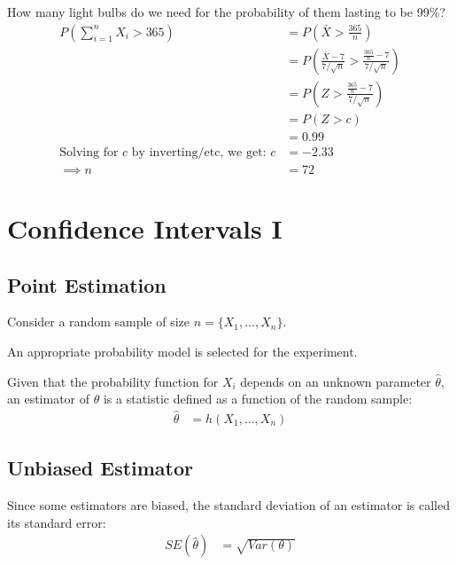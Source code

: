                     How many light bulbs do we need for the probability of them lasting to be 99\%?
                    \begin{align*}
                        P(\sum_{i=1}^{n} X_i > 365) &= P(\bar{X} > \frac{365}{n}) \\
                        &= P(\frac{\bar{X}-7}{7/\sqrt{n}} > \frac{\frac{365}{n}-7}{7/\sqrt{n}}) \\
                        &= P(Z > \frac{\frac{365}{n}-7}{7/\sqrt{n}}) \\
                        &= P(Z > c) \\
                        &= 0.99 \\
                        \text{Solving for $c$ by inverting/etc, we get: } c&=-2.33 \\
                        \implies n &= 72
                    \end{align*}
        \chapter{Confidence Intervals I} %
        \label{cha:confidence_intervals_i}
            \section{Point Estimation} %
            \label{sec:point_estimation}
                Consider a random sample of size $n = \{X_1, \ldots, X_n \}$.

                An appropriate probability model is selected for the experiment.

                Given that the probability function for $X_i$ depends on an unknown parameter $\hat{\theta}$, an estimator of $\theta$ is a statistic defined as a function of the random sample:
                \begin{align*}
                    \hat{\theta} &= h(X_1, \ldots, X_n)
                \end{align*}
            \section{Unbiased Estimator} %
            \label{sec:unbiased_estimator}
                Since some estimators are biased, the standard deviation of an estimator is called its standard error:
                \begin{align*}
                    SE(\hat{\theta}) &= \sqrt{Var(\theta)}
                \end{align*}

